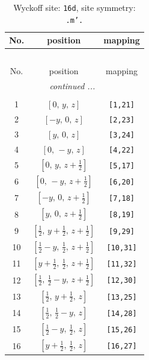 \documentclass[fleqn,8pt]{jsarticle}
\begin{document}
\begin{longtable}{ccc}
\caption{Wyckoff site: {\tt 16d}, site symmetry: {\tt .m'.}}
 \\
 \hline \hline
No. & position & mapping \\ \hline \endfirsthead

\multicolumn{2}{l}{\tablename\ \thetable{}} \\
 \hline \hline
No. & position & mapping \\ \hline \endhead

 \hline \hline
\multicolumn{2}{r}{\footnotesize\it continued ...} \\ \endfoot

 \hline \hline
\multicolumn{2}{r}{} \\ \endlastfoot

1 & $\left[ 0,\, y,\, z \right]$ & {\tt [1,21]} \\ \hline
2 & $\left[ - y,\, 0,\, z \right]$ & {\tt [2,23]} \\ \hline
3 & $\left[ y,\, 0,\, z \right]$ & {\tt [3,24]} \\ \hline
4 & $\left[ 0,\, - y,\, z \right]$ & {\tt [4,22]} \\ \hline
5 & $\left[ 0,\, y,\, z + \frac{1}{2} \right]$ & {\tt [5,17]} \\ \hline
6 & $\left[ 0,\, - y,\, z + \frac{1}{2} \right]$ & {\tt [6,20]} \\ \hline
7 & $\left[ - y,\, 0,\, z + \frac{1}{2} \right]$ & {\tt [7,18]} \\ \hline
8 & $\left[ y,\, 0,\, z + \frac{1}{2} \right]$ & {\tt [8,19]} \\ \hline
9 & $\left[ \frac{1}{2},\, y + \frac{1}{2},\, z + \frac{1}{2} \right]$ & {\tt [9,29]} \\ \hline
10 & $\left[ \frac{1}{2} - y,\, \frac{1}{2},\, z + \frac{1}{2} \right]$ & {\tt [10,31]} \\ \hline
11 & $\left[ y + \frac{1}{2},\, \frac{1}{2},\, z + \frac{1}{2} \right]$ & {\tt [11,32]} \\ \hline
12 & $\left[ \frac{1}{2},\, \frac{1}{2} - y,\, z + \frac{1}{2} \right]$ & {\tt [12,30]} \\ \hline
13 & $\left[ \frac{1}{2},\, y + \frac{1}{2},\, z \right]$ & {\tt [13,25]} \\ \hline
14 & $\left[ \frac{1}{2},\, \frac{1}{2} - y,\, z \right]$ & {\tt [14,28]} \\ \hline
15 & $\left[ \frac{1}{2} - y,\, \frac{1}{2},\, z \right]$ & {\tt [15,26]} \\ \hline
16 & $\left[ y + \frac{1}{2},\, \frac{1}{2},\, z \right]$ & {\tt [16,27]} \\
\end{longtable}
\end{document}
